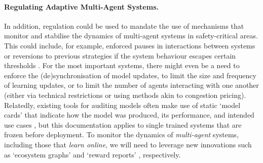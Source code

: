 \paragraph{Regulating Adaptive Multi-Agent Systems.}
In addition, {regulation} could be used to mandate the use of mechanisms that monitor and stabilise the dynamics of multi-agent systems in safety-critical areas.
This could include, for example, enforced pauses in interactions between systems or reversions to previous strategies if the system behaviour escapes certain thresholds \citep[as in the 2010 flash crash, when trading was temporarily halted; see also]{Subrahmanyam2013}.
For the most important systems, there might even be a need to enforce the (de)synchronisation of model updates, to limit the size and frequency of learning updates, or to limit the number of agents interacting with one another (either via technical restrictions or using methods akin to congestion pricing).
Relatedly, existing tools for auditing models often make use of static `model cards' that indicate how the model was produced, its performance, and intended use cases \citep{Mitchell2019}, but this documentation applies to single trained systems that are frozen before deployment.
To monitor the dynamics of \emph{multi-agent} systems, including those that \emph{learn online}, we will need to leverage new innovations such as `ecosystem graphs' \citep{Bommasani2023} and `reward reports' \citep{Gilbert2022}, respectively.
